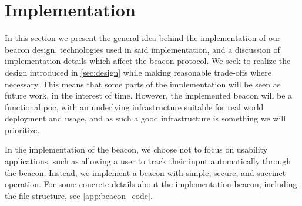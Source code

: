 \section{Implementation}%
\label{sec:implementation}

In this section we present the general idea behind the implementation of our beacon design, technologies used in said implementation, and a discussion of implementation details which affect the beacon protocol.
We seek to realize the design introduced in \cref{sec:design} while making reasonable trade-offs where necessary.
This means that some parts of the implementation will be seen as future work, in the interest of time.
However, the implemented beacon will be a functional \gls{poc}, with an underlying infrastructure suitable for real world deployment and usage, and as such a good infrastructure is something we will prioritize.

In the implementation of the beacon, we choose not to focus on usability applications, such as allowing a user to track their input automatically through the beacon.
Instead, we implement a beacon with simple, secure, and succinct operation.
For some concrete details about the implementation beacon, including the file structure, see \vref{app:beacon_code}.

